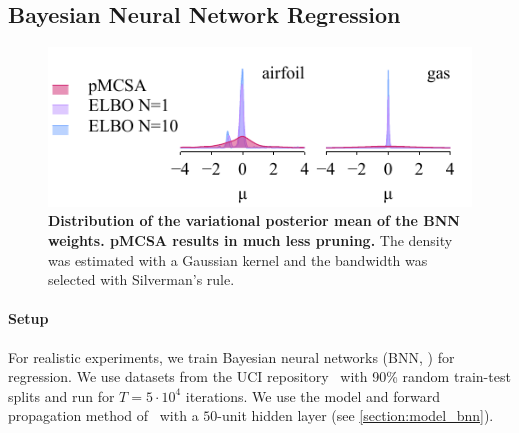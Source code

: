% 



  \vspace{-0.1in}
\subsection{Bayesian Neural Network Regression}\label{section:bnn}
  \vspace{-0.07in}
%
\begin{figure}
  \vspace{-5.ex}
  \centering
  \includegraphics[scale=0.9]{figures/pruning_01.pdf}
  \vspace{-2ex}
  \caption{\textbf{
      Distribution of the variational posterior mean of the BNN weights.
      pMCSA results in much less pruning.
    }
    The density was estimated with a Gaussian kernel and the bandwidth was selected with Silverman's rule.
  }\label{fig:pruning}
\end{figure}
%
\paragraph{Setup}
For realistic experiments, we train Bayesian neural networks (BNN, \citealt{neal_bayesian_1996}) for regression.
We use datasets from the UCI repository~\citep{Dua:2019} with 90\% random train-test splits and run for \(T=5\cdot10^4\) iterations.
We use the model and forward propagation method of~\citet{pmlr-v37-hernandez-lobatoc15} with a \(50\)-unit hidden layer (see \cref{section:model_bnn}).

